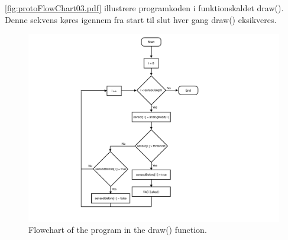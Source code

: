 \autoref{fig:protoFlowChart03.pdf} illustrere programkoden i funktionskaldet draw(). Denne sekvens køres igennem fra start til slut hver gang draw() eksikveres.            

\begin{figure}[H]
\centering
\includegraphics[scale=0.5]{Figure/protoFlowChart03.pdf}
\caption{Flowchart of the program in the draw() function.}
\label{fig:protoFlowChart03.pdf}
\end{figure}

 